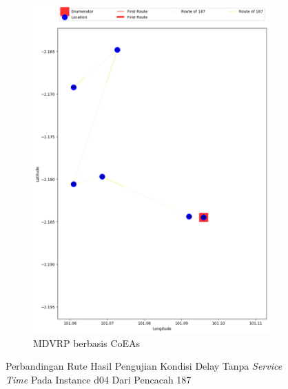 \begin{figure}[H]
	\centering
	\begin{subfigure}[t]{\textwidth}
		\centering
		\includegraphics[width=\textwidth]{Resources/Images/delayed_5/real_m15_n100_delayed_5_187_coes}
		\caption{MDVRP berbasis CoEAs}
		\label{fig:real_m15_n100_delayed_5_187_coes}
	\end{subfigure}
	\caption{Perbandingan Rute Hasil Pengujian Kondisi Delay Tanpa \textit{Service Time} Pada Instance d04 Dari Pencacah 187}
	\label{fig:real_m15_n100_delayed_5_187}
\end{figure}


